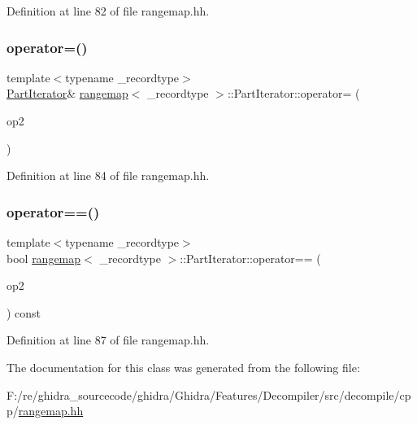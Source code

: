 Definition at line 82 of file rangemap.\+hh.

\mbox{\label{classrangemap_1_1_part_iterator_a980901e94694562b197f98ea33f77f00}} 
\subsubsection{\texorpdfstring{operator=()}{operator=()}}
{\footnotesize\ttfamily template$<$typename \+\_\+recordtype$>$ \\
\mbox{\hyperlink{classrangemap_1_1_part_iterator}{Part\+Iterator}}\& \mbox{\hyperlink{classrangemap}{rangemap}}$<$ \+\_\+recordtype $>$\+::Part\+Iterator\+::operator= (\begin{DoxyParamCaption}\item[{const \mbox{\hyperlink{classrangemap_1_1_part_iterator}{Part\+Iterator}} \&}]{op2 }\end{DoxyParamCaption})\hspace{0.3cm}{\ttfamily [inline]}}



Definition at line 84 of file rangemap.\+hh.

\mbox{\label{classrangemap_1_1_part_iterator_a9dfa0ccb8f54931b5247704649808413}} 
\subsubsection{\texorpdfstring{operator==()}{operator==()}}
{\footnotesize\ttfamily template$<$typename \+\_\+recordtype$>$ \\
bool \mbox{\hyperlink{classrangemap}{rangemap}}$<$ \+\_\+recordtype $>$\+::Part\+Iterator\+::operator== (\begin{DoxyParamCaption}\item[{const \mbox{\hyperlink{classrangemap_1_1_part_iterator}{Part\+Iterator}} \&}]{op2 }\end{DoxyParamCaption}) const\hspace{0.3cm}{\ttfamily [inline]}}



Definition at line 87 of file rangemap.\+hh.



The documentation for this class was generated from the following file\+:\begin{DoxyCompactItemize}
\item 
F\+:/re/ghidra\+\_\+sourcecode/ghidra/\+Ghidra/\+Features/\+Decompiler/src/decompile/cpp/\mbox{\hyperlink{rangemap_8hh}{rangemap.\+hh}}\end{DoxyCompactItemize}
